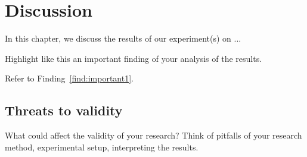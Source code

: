 \documentclass[../main]{subfiles}
\begin{document}
\chapter{Discussion}
\label{ch:discussion}
In this chapter, we discuss the results of our experiment(s) on ...

\begin{finding}
	Highlight like this an important finding of your analysis of the results.
	\label{find:important1}
\end{finding}

Refer to Finding~\ref{find:important1}.

\section{Threats to validity}
What could affect the validity of your research? Think of pitfalls of your research method, experimental setup, interpreting the results.
\end{document}
